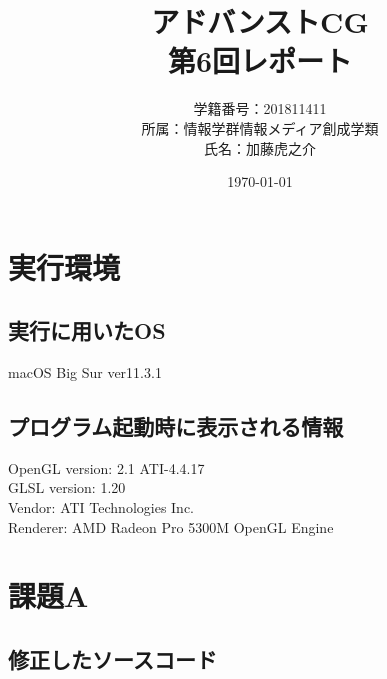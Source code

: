\documentclass[a4paper,10pt,uplatex,dvipdfmx]{jsarticle}
\begin{document}
\title{アドバンストCG\\ \huge 第6回レポート}
\author{学籍番号：201811411\\ 所属：情報学群情報メディア創成学類\\ 氏名：加藤虎之介}
\date{\today}
\maketitle

\section{実行環境}
\subsection{実行に用いたOS}
macOS Big Sur ver11.3.1

\subsection{プログラム起動時に表示される情報}
\begin{screen}
	OpenGL version: 2.1 ATI-4.4.17\\
	GLSL version: 1.20\\
	Vendor: ATI Technologies Inc.\\
	Renderer: AMD Radeon Pro 5300M OpenGL Engine
\end{screen}

\section{課題A}
\subsection{修正したソースコード}
\end{document}
